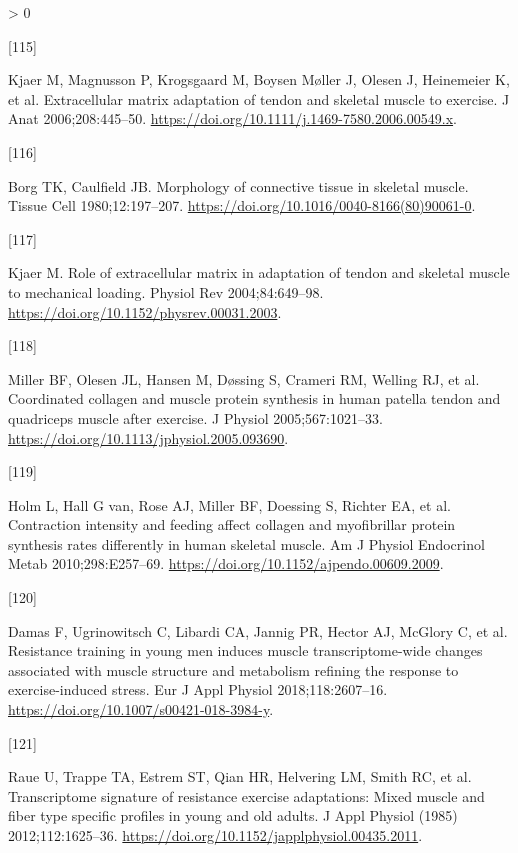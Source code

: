 \documentclass[twoside,10pt]{gihclass} %
\newlength{\cslhangindent}
\newlength{\csllabelwidth}
\newenvironment{CSLReferences}[3] %
 {%
  \setlength{\parindent}{0pt}
  \ifodd #1 \everypar{\setlength{\hangindent}{\cslhangindent}}\ignorespaces\fi
  \ifnum #2 > 0
  \setlength{\parskip}{#2\baselineskip}
  \fi
 }%
 {}
\newcommand{\CSLLeftMargin}[1]{\parbox[t]{\maxof{\widthof{#1}}{\csllabelwidth}}{#1}}
\newcommand{\CSLRightInline}[1]{\parbox[t]{\linewidth}{#1}}
\begin{document}
\begin{CSLReferences}{0}{0}
\leavevmode\hypertarget{ref-RN2770}{}%
\CSLLeftMargin{{[}115{]} }
\CSLRightInline{Kjaer M, Magnusson P, Krogsgaard M, Boysen Møller J, Olesen J, Heinemeier K, et al. Extracellular matrix adaptation of tendon and skeletal muscle to exercise. J Anat 2006;208:445--50. \url{https://doi.org/10.1111/j.1469-7580.2006.00549.x}.}

\leavevmode\hypertarget{ref-RN2783}{}%
\CSLLeftMargin{{[}116{]} }
\CSLRightInline{Borg TK, Caulfield JB. Morphology of connective tissue in skeletal muscle. Tissue Cell 1980;12:197--207. \url{https://doi.org/10.1016/0040-8166(80)90061-0}.}

\leavevmode\hypertarget{ref-RN2421}{}%
\CSLLeftMargin{{[}117{]} }
\CSLRightInline{Kjaer M. Role of extracellular matrix in adaptation of tendon and skeletal muscle to mechanical loading. Physiol Rev 2004;84:649--98. \url{https://doi.org/10.1152/physrev.00031.2003}.}

\leavevmode\hypertarget{ref-RN2788}{}%
\CSLLeftMargin{{[}118{]} }
\CSLRightInline{Miller BF, Olesen JL, Hansen M, Døssing S, Crameri RM, Welling RJ, et al. Coordinated collagen and muscle protein synthesis in human patella tendon and quadriceps muscle after exercise. J Physiol 2005;567:1021--33. \url{https://doi.org/10.1113/jphysiol.2005.093690}.}

\leavevmode\hypertarget{ref-RN2454}{}%
\CSLLeftMargin{{[}119{]} }
\CSLRightInline{Holm L, Hall G van, Rose AJ, Miller BF, Doessing S, Richter EA, et al. Contraction intensity and feeding affect collagen and myofibrillar protein synthesis rates differently in human skeletal muscle. Am J Physiol Endocrinol Metab 2010;298:E257--69. \url{https://doi.org/10.1152/ajpendo.00609.2009}.}

\leavevmode\hypertarget{ref-RN2298}{}%
\CSLLeftMargin{{[}120{]} }
\CSLRightInline{Damas F, Ugrinowitsch C, Libardi CA, Jannig PR, Hector AJ, McGlory C, et al. Resistance training in young men induces muscle transcriptome-wide changes associated with muscle structure and metabolism refining the response to exercise-induced stress. Eur J Appl Physiol 2018;118:2607--16. \url{https://doi.org/10.1007/s00421-018-3984-y}.}

\leavevmode\hypertarget{ref-RN774}{}%
\CSLLeftMargin{{[}121{]} }
\CSLRightInline{Raue U, Trappe TA, Estrem ST, Qian HR, Helvering LM, Smith RC, et al. Transcriptome signature of resistance exercise adaptations: Mixed muscle and fiber type specific profiles in young and old adults. J Appl Physiol (1985) 2012;112:1625--36. \url{https://doi.org/10.1152/japplphysiol.00435.2011}.}


\end{CSLReferences}
\end{document}
